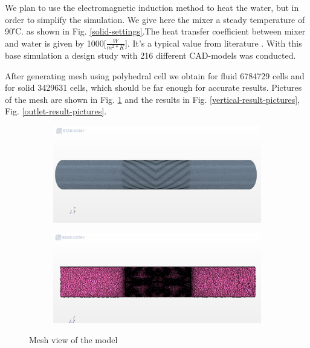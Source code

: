\documentclass[journal,article,processes,submit,moreauthors,pdftex]{Definitions/mdpi}
\begin{document}
We plan to use the electromagnetic induction method to heat the water, but in order to simplify the simulation. We give here the mixer a steady temperature of 90℃. as shown in  Fig. \ref{solid-settings}.The heat transfer coefficient between mixer and water is given by 1000[$\frac{W}{m^{2}*K}$]. It's a typical value from literature \cite{uebergang-fluessigkeit}. With this base simulation a design study with 216 different CAD-models was conducted.

After generating mesh using polyhedral cell we obtain for fluid 6784729 cells and for solid 3429631 cells, which should be far enough for accurate results. Pictures of the mesh are shown in Fig. \ref{mesh-pictures} and the results in Fig. \ref{vertical-result-pictures}, Fig. \ref{outlet-result-pictures}.

\begin{figure}
\begin{center}
\centering
\begin{subfigure}{1.0\textwidth}
\includegraphics[width=\linewidth]{./docu_pictures/model1.png}
\end{subfigure}
\begin{subfigure}{1.0\textwidth}
\includegraphics[width=\linewidth]{./docu_pictures/model2.png}
\end{subfigure}
\end{center}
\caption{Mesh view of the model}
\label{mesh-pictures}
\end{figure}
\end{document}
